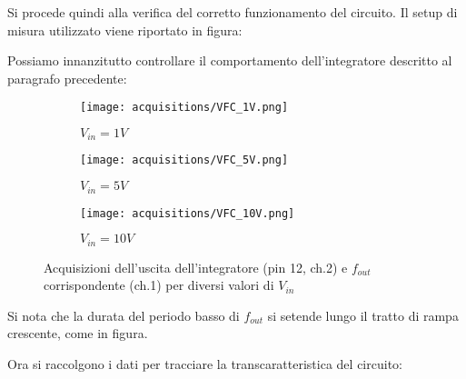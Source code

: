 
Si procede quindi alla verifica del corretto funzionamento del circuito. Il setup di
misura utilizzato viene riportato in figura:


Possiamo innanzitutto controllare il comportamento dell'integratore descritto al
paragrafo precedente:

\begin{figure}[ht]
    \centering

    \begin{subfigure}{.5\textwidth}
        \centering
        \texttt{[image: acquisitions/VFC\_1V.png]}
        \caption{$V_{in}=1V$}
        \label{acq_vfc110_1v}
    \end{subfigure}%
    \begin{subfigure}{.5\textwidth}
        \centering
        \texttt{[image: acquisitions/VFC\_5V.png]}
        \caption{$V_{in}=5V$}
        \label{acq_vfc110_5v}
    \end{subfigure}
    \begin{subfigure}{.5\textwidth}
        \centering
        \texttt{[image: acquisitions/VFC\_10V.png]}
        \caption{$V_{in}=10V$}
        \label{acq_vfc110_10v}
    \end{subfigure}

    \caption{Acquisizioni dell'uscita dell'integratore (pin 12, ch.2) e $f_{out}$
        corrispondente (ch.1) per diversi valori di $V_{in}$}
    \label{acq_vfc110}
\end{figure}

Si nota che la durata del periodo basso di $f_{out}$ si setende lungo il tratto di rampa
crescente, come in figura.

Ora si raccolgono i dati per tracciare la transcaratteristica del circuito:

